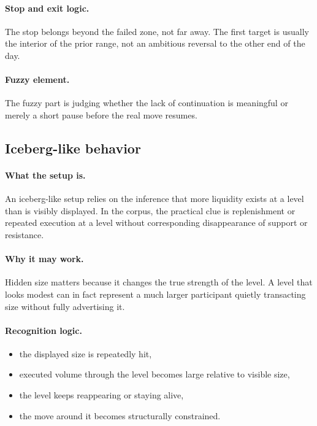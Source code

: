 \paragraph{Stop and exit logic.} The stop belongs beyond the failed zone, not far away. The first target is usually the interior of the prior range, not an ambitious reversal to the other end of the day.

\paragraph{Fuzzy element.} The fuzzy part is judging whether the lack of continuation is meaningful or merely a short pause before the real move resumes.


\subsection{Iceberg-like behavior}

\paragraph{What the setup is.} An iceberg-like setup relies on the inference that more liquidity exists at a level than is visibly displayed. In the corpus, the practical clue is replenishment or repeated execution at a level without corresponding disappearance of support or resistance.

\paragraph{Why it may work.} Hidden size matters because it changes the true strength of the level. A level that looks modest can in fact represent a much larger participant quietly transacting size without fully advertising it.

\paragraph{Recognition logic.}
\begin{itemize}
\item the displayed size is repeatedly hit,
\item executed volume through the level becomes large relative to visible size,
\item the level keeps reappearing or staying alive,
\item the move around it becomes structurally constrained.
\end{itemize}

